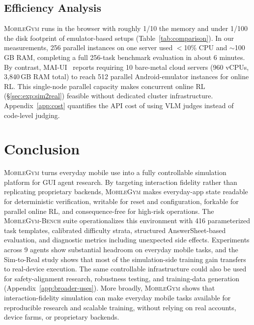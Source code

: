 \documentclass{llmxive}
\providecommand{\sys}{\textsc{MobileGym}}
\providecommand{\bench}{\textsc{MobileGym-Bench}}
\begin{document}
\subsection{Efficiency Analysis}\label{sec:exp:efficiency}

\sys{} runs in the browser with roughly 1/10 the memory and under 1/100 the disk footprint of emulator-based setups (Table~\ref{tab:comparison}). In our measurements, 256 parallel instances on one server used $<$10\% CPU and $\sim$100\,GB RAM, completing a full 256-task benchmark evaluation in about 6 minutes. By contrast, MAI-UI~\cite{MAIUI} reports requiring 10 bare-metal cloud servers (960 vCPUs, 3{,}840\,GB RAM total) to reach 512 parallel Android-emulator instances for online RL. This single-node parallel capacity makes concurrent online RL (§\ref{sec:exp:sim2real}) feasible without dedicated cluster infrastructure. Appendix~\ref{app:cost} quantifies the API cost of using VLM judges instead of code-level judging.


\section{Conclusion}\label{sec:conclusion}

\sys{} turns everyday mobile use into a fully controllable simulation platform for GUI agent research. By targeting interaction fidelity rather than replicating proprietary backends, \sys{} makes everyday-app state readable for deterministic verification, writable for reset and configuration, forkable for parallel online RL, and consequence-free for high-risk operations. The \bench{} suite operationalizes this environment with 416 parameterized task templates, calibrated difficulty strata, structured AnswerSheet-based evaluation, and diagnostic metrics including unexpected side effects. Experiments across 9 agents show substantial headroom on everyday mobile tasks, and the Sim-to-Real study shows that most of the simulation-side training gain transfers to real-device execution. The same controllable infrastructure could also be used for safety-alignment research, robustness testing, and training-data generation (Appendix~\ref{app:broader-uses}). More broadly, \sys{} shows that interaction-fidelity simulation can make everyday mobile tasks available for reproducible research and scalable training, without relying on real accounts, device farms, or proprietary backends.
\end{document}
